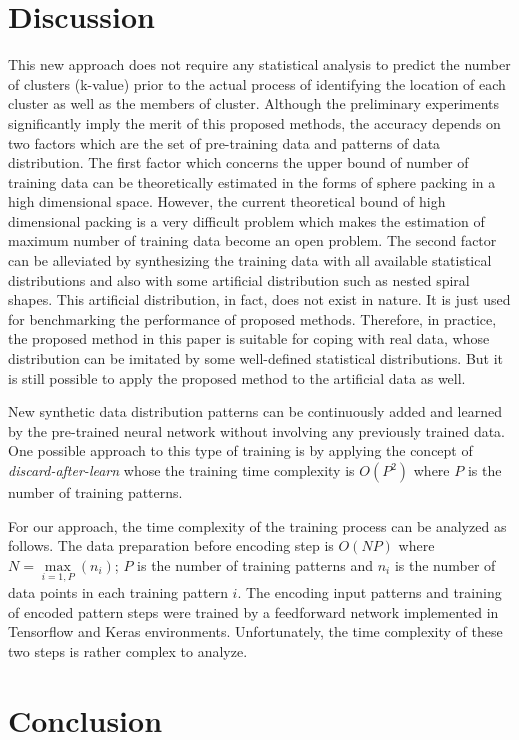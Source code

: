 \documentclass[lettersize,journal]{IEEEtran}
\begin{document}
\section{Discussion}
This new approach does not require any statistical analysis to predict the number of clusters (k-value)
prior to the actual process of identifying the location of each cluster as well as the members of cluster.
Although the preliminary experiments significantly imply the merit of this proposed methods, the accuracy
depends on two factors which are the set of pre-training data and patterns of data distribution.
The first factor which concerns the upper bound of number of training data can be theoretically estimated
in the forms of sphere packing in a high dimensional space. However, the current theoretical bound of
high dimensional packing is a very difficult problem which makes the estimation of maximum number of
training data become an open problem. The second factor can be alleviated by synthesizing the training
data with all available statistical distributions and also with some artificial distribution such as 
nested spiral shapes. This artificial distribution, in fact, does not exist in nature. It is just used 
for benchmarking the performance of proposed methods. Therefore, in practice, the proposed method in 
this paper is suitable for coping with real data, whose distribution can be imitated by some well-defined 
statistical distributions. But it is still possible to apply the proposed method to the artificial data
as well. 

New synthetic data distribution patterns can be continuously added and learned by the pre-trained neural 
network without involving any previously trained data. One possible approach to this type of training 
is by applying the concept of {\em discard-after-learn} \cite{Prem}\cite{Mongkhon} whose the training time 
complexity is $O(P^{2})$ where $P$ is the number of training patterns. 

For our approach, the time 
complexity of the training process can be analyzed as follows. The data preparation before encoding step 
is $O(NP)$ where $N = \max\limits_{i=1,P}(n_{i})$; $P$ is the number of training patterns and $n_{i}$ is the 
number of data points in each training pattern $i$. The encoding input patterns and training of encoded 
pattern steps were trained by a feedforward network implemented in Tensorflow and Keras environments.
Unfortunately, the time complexity of these two steps is rather complex to analyze.

\section{Conclusion}
\end{document}
